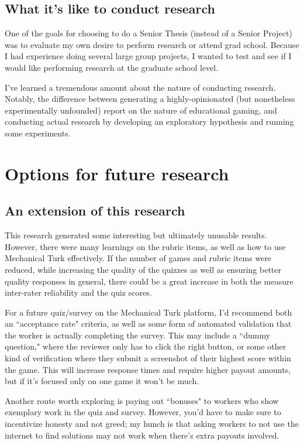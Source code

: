 \documentclass[12pt]{report}
\begin{document}
		\subsection{What it's like to conduct research}
			One of the goals for choosing to do a Senior Thesis (instead of a Senior Project) was to evaluate my own desire to perform research or attend grad school. Because I had experience doing several large group projects, I wanted to test and see if I would like performing research at the graduate school level.

			I've learned a tremendous amount about the nature of conducting research. Notably, the difference between generating a highly-opinionated (but nonetheless experimentally unfounded) report on the nature of educational gaming, and conducting actual research by developing an exploratory hypothesis and running some experiments.

	\section{Options for future research}
		\subsection{An extension of this research}

			This research generated some interesting but ultimately unusable results. However, there were many learnings on the rubric items, as well as how to use Mechanical Turk effectively. If the number of games and rubric items were reduced, while increasing the quality of the quizzes as well as ensuring better quality responses in general, there could be a great increase in both the measure inter-rater reliability and the quiz scores.

			For a future quiz/survey on the Mechanical Turk platform, I'd recommend both an ``acceptance rate" criteria, as well as some form of automated validation that the worker is actually completing the survey. This may include a ``dummy question," where the reviewer only has to click the right button, or some other kind of verification where they submit a screenshot of their highest score within the game. This will increase response times and require higher payout amounts, but if it's focused only on one game it won't be much.

			Another route worth exploring is paying out ``bonuses" to workers who show exemplary work in the quiz and survey. However, you'd have to make sure to incentivize honesty and not greed; my hunch is that asking workers to not use the internet to find solutions may not work when there's extra payouts involved.
\end{document}
